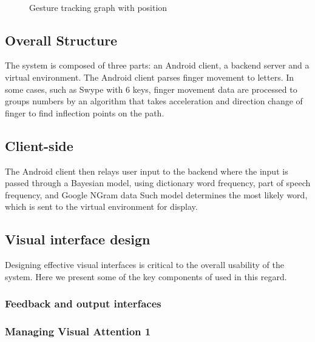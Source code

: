 \documentclass{sigchi}
\begin{document}
\begin{figure}
\centering

  
  \caption{Gesture tracking graph with position}~\label{fig:position}
\end{figure}



\subsection{Overall Structure}
The system is composed of three parts: an Android client, a backend server and a virtual environment. The Android client parses finger movement to letters. In some cases, such as Swype with 6 keys, finger movement data are processed to groups numbers by an algorithm that takes acceleration and direction change of finger to find inflection points on the path.

\subsection{Client-side}
The Android client then relays user input to the backend where the input is passed through a Bayesian model, using dictionary word frequency, part of speech frequency, and Google NGram data Such model determines the most likely word, which is sent to the virtual environment for display.

\subsection{Visual interface design}
Designing effective visual interfaces is critical to the overall usability of the system. Here we present some of the key components of used in this regard. 

\subsubsection{Feedback and output interfaces}
\subsubsection{Managing Visual Attention 1}
\end{document}
